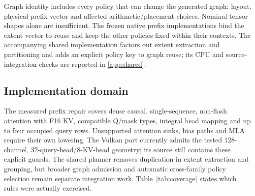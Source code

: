 Graph identity includes every policy that can change the generated graph: layout, physical-prefix vector and affected arithmetic/placement choices. Nominal tensor shapes alone are insufficient. The frozen native prefix implementations bind the extent vector to reuse and keep the other policies fixed within their contexts. The accompanying shared implementation factors out extent extraction and partitioning and adds an explicit policy key to graph reuse; its CPU and source-integration checks are reported in \ref{app:shared}.

\subsection{Implementation domain}
\label{sec:domain}
The measured prefix repair covers dense causal, single-sequence, non-flash attention with F16 KV, compatible Q/mask types, integral head mapping and up to four occupied query rows. Unsupported attention sinks, bias paths and MLA require their own lowering. The Vulkan port currently admits the tested 128-channel, 32-query-head/8-KV-head geometry; its source still contains these explicit guards. The shared planner removes duplication in extent extraction and grouping, but broader graph admission and automatic cross-family policy selection remain separate integration work. Table~\ref{tab:coverage} states which rules were actually exercised.
